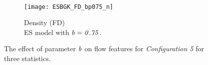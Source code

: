 \documentclass{rsproca}%
\begin{document}
\begin{figure}
\begin{subfigure}[b]{0.32\textwidth}
                \label{fig:ESBGK_FD_b0_n}
        \end{subfigure}
        ~ %
        \begin{subfigure}[b]{0.32\textwidth}
                \centering
                \texttt{[image: ESBGK\_FD\_bp075\_n]}
                \caption{Density (FD) \\ ES model with $\it{b=0.75}$.}
                \label{fig:ESBGK_FD_bp075_n}
        \end{subfigure}	
        \caption{The effect of parameter $\it{b}$ on flow features for \emph{Configuration 5} for three statistics.}
				\label{fig:test_b_parameter}
\end{figure}
\end{document}

